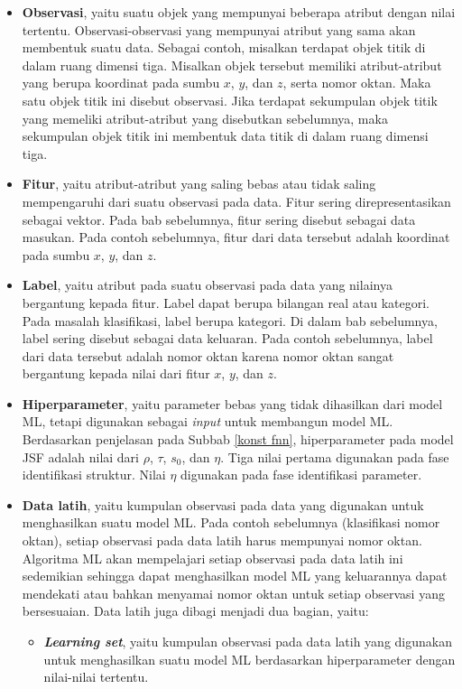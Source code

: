 \begin{itemize}
    \item \textbf{Observasi}, yaitu suatu objek yang mempunyai beberapa atribut dengan nilai tertentu. Observasi-observasi yang mempunyai atribut yang sama akan membentuk suatu data. Sebagai contoh, misalkan terdapat objek titik di dalam ruang dimensi tiga. Misalkan objek tersebut memiliki atribut-atribut yang berupa koordinat pada sumbu $x$, $y$, dan $z$, serta nomor oktan. Maka satu objek titik ini disebut observasi. Jika terdapat sekumpulan objek titik yang memeliki atribut-atribut yang disebutkan sebelumnya, maka sekumpulan objek titik ini membentuk data titik di dalam ruang dimensi tiga.
    \item \textbf{Fitur}, yaitu atribut-atribut yang saling bebas atau tidak saling mempengaruhi dari suatu observasi pada data. Fitur sering direpresentasikan sebagai vektor. Pada bab sebelumnya, fitur sering disebut sebagai data masukan. Pada contoh sebelumnya, fitur dari data tersebut adalah koordinat pada sumbu $x$, $y$, dan $z$.
    \item \textbf{Label}, yaitu atribut pada suatu observasi pada data yang nilainya bergantung kepada fitur. Label dapat berupa bilangan real atau kategori. Pada masalah klasifikasi, label berupa kategori. Di dalam bab sebelumnya, label sering disebut sebagai data keluaran. Pada contoh sebelumnya, label dari data tersebut adalah nomor oktan karena nomor oktan sangat bergantung kepada nilai dari fitur $x$, $y$, dan $z$.
    \item \textbf{Hiperparameter}, yaitu parameter bebas yang tidak dihasilkan dari model ML, tetapi digunakan sebagai \emph{input} untuk membangun model ML. Berdasarkan penjelasan pada Subbab \ref{konst fnn}, hiperparameter pada model JSF adalah nilai dari $\rho$, $\tau$, $s_0$, dan $\eta$. Tiga nilai pertama digunakan pada fase identifikasi struktur. Nilai $\eta$ digunakan pada fase identifikasi parameter.
    \item \textbf{Data latih}, yaitu kumpulan observasi pada data yang digunakan untuk menghasilkan suatu model ML. Pada contoh sebelumnya (klasifikasi nomor oktan), setiap observasi pada data latih harus mempunyai nomor oktan. Algoritma ML akan mempelajari setiap observasi pada data latih ini sedemikian sehingga dapat menghasilkan model ML yang keluarannya dapat mendekati atau bahkan menyamai nomor oktan untuk setiap observasi yang bersesuaian. Data latih juga dibagi menjadi dua bagian, yaitu:
    \begin{itemize}
        \item \textbf{\emph{Learning set}}, yaitu kumpulan observasi pada data latih yang digunakan untuk menghasilkan suatu model ML berdasarkan hiperparameter dengan nilai-nilai tertentu.

\end{itemize}
\end{itemize}

